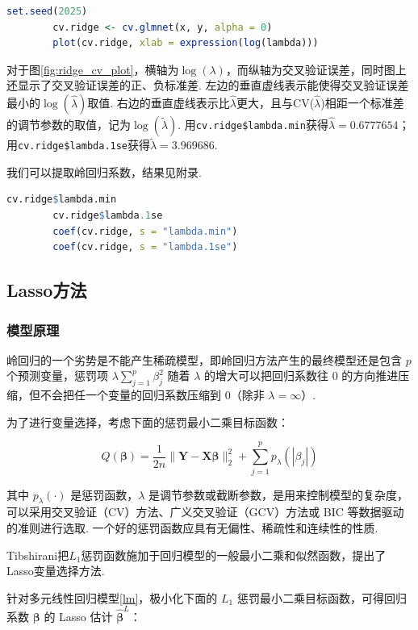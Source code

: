 \documentclass[12pt, a4paper, oneside]{ctexart}
\begin{document}
	\begin{lstlisting}[language=R]
		set.seed(2025)
		cv.ridge <- cv.glmnet(x, y, alpha = 0)
		plot(cv.ridge, xlab = expression(log(lambda)))
	\end{lstlisting}
	
	对于图\eqref{fig:ridge_cv_plot}，横轴为$\log(\lambda)$，而纵轴为交叉验证误差，同时图上还显示了交叉验证误差的正、负标准差. 左边的垂直虚线表示能使得交叉验证误差最小的$\log(\hat{\lambda})$取值. 右边的垂直虚线表示比$\hat{\lambda}$更大，且与CV($\hat{\lambda}$)相距一个标准差的调节参数的取值，记为$\log(\tilde{\lambda})$. 用\texttt{cv.ridge\$lambda.min}获得$\hat{\lambda }= 0.6777654$；用\texttt{cv.ridge\$lambda.1se}获得$\tilde{\lambda }= 3.969686$.
	
	我们可以提取岭回归系数，结果见附录.
	\begin{lstlisting}[language=R]
		cv.ridge$lambda.min
		cv.ridge$lambda.1se
		coef(cv.ridge, s = "lambda.min")
		coef(cv.ridge, s = "lambda.1se")
	\end{lstlisting}
	
	\subsection{Lasso方法}
	\subsubsection{模型原理}
	岭回归的一个劣势是不能产生稀疏模型，即岭回归方法产生的最终模型还是包含 $p$ 个预测变量，惩罚项 $\lambda \sum_{j=1}^{p} \beta_j^2$ 随着 $\lambda$ 的增大可以把回归系数往 $0$ 的方向推进压缩，但不会把任一个变量的回归系数压缩到 $0$（除非 $\lambda = \infty$）.
	
	
	
	为了进行变量选择，考虑下面的惩罚最小二乘目标函数：
	
	\begin{equation}
		Q(\bm{\beta}) = \frac{1}{2n} \|\bm{Y} - \bm{X}\bm{\beta} \|_2^2 + \sum_{j=1}^{p} p_{\lambda}(|\beta_j|)
	\end{equation}
	
	其中 $p_{\lambda}(\cdot)$ 是惩罚函数，$\lambda$ 是调节参数或截断参数，是用来控制模型的复杂度，可以采用交叉验证（CV）方法、广义交叉验证（GCV）方法或 BIC 等数据驱动的准则进行选取. 一个好的惩罚函数应具有无偏性、稀疏性和连续性的性质.
	
	Tibshirani把$L_{1}$惩罚函数施加于回归模型的一般最小二乘和似然函数，提出了Lasso变量选择方法.
	
	针对多元线性回归模型\eqref{lm}，极小化下面的 $L_1$ 惩罚最小二乘目标函数，可得回归系数 $\bm{\beta}$ 的 Lasso 估计 $\bm{\hat{\beta}}^L$：
	
\end{document}
